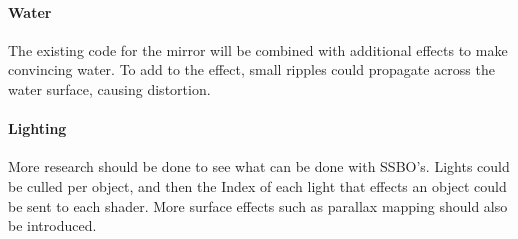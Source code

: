 \documentclass[conference]{acmsiggraph}
\begin{document}
\paragraph{Water}
The existing code for the mirror will be combined with additional effects to make convincing water. To add to the effect, small ripples could propagate across the water surface, causing distortion.

\paragraph{Lighting}
More research should be done to see what can be done with SSBO's. Lights could be culled per object, and then the Index of each light that effects an object could be sent to each shader. More surface effects such as parallax mapping should also be introduced.



\end{document}
